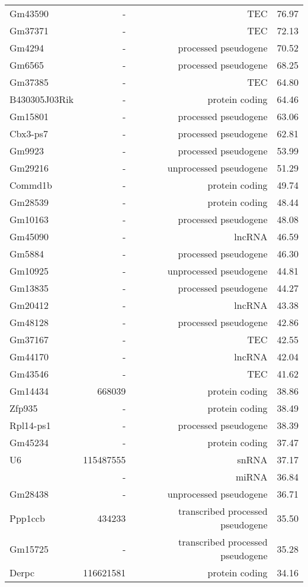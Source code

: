 \begin{longtable}[t]{lrrr}
Gm43590 & - & TEC & 76.97\\
Gm37371 & - & TEC & 72.13\\
Gm4294 & - & processed pseudogene & 70.52\\
\addlinespace
Gm6565 & - & processed pseudogene & 68.25\\
Gm37385 & - & TEC & 64.80\\
B430305J03Rik & - & protein coding & 64.46\\
Gm15801 & - & processed pseudogene & 63.06\\
Cbx3-ps7 & - & processed pseudogene & 62.81\\
\addlinespace
Gm9923 & - & processed pseudogene & 53.99\\
Gm29216 & - & unprocessed pseudogene & 51.29\\
Commd1b & - & protein coding & 49.74\\
Gm28539 & - & protein coding & 48.44\\
Gm10163 & - & processed pseudogene & 48.08\\
\addlinespace
Gm45090 & - & lncRNA & 46.59\\
Gm5884 & - & processed pseudogene & 46.30\\
Gm10925 & - & unprocessed pseudogene & 44.81\\
Gm13835 & - & processed pseudogene & 44.27\\
Gm20412 & - & lncRNA & 43.38\\
\addlinespace
Gm48128 & - & processed pseudogene & 42.86\\
Gm37167 & - & TEC & 42.55\\
Gm44170 & - & lncRNA & 42.04\\
Gm43546 & - & TEC & 41.62\\
Gm14434 & 668039 & protein coding & 38.86\\
\addlinespace
Zfp935 & - & protein coding & 38.49\\
Rpl14-ps1 & - & processed pseudogene & 38.39\\
Gm45234 & - & protein coding & 37.47\\
U6 & 115487555 & snRNA & 37.17\\
 & - & miRNA & 36.84\\
\addlinespace
Gm28438 & - & unprocessed pseudogene & 36.71\\
Ppp1ccb & 434233 & transcribed processed pseudogene & 35.50\\
Gm15725 & - & transcribed processed pseudogene & 35.28\\
Derpc & 116621581 & protein coding & 34.16\\

\end{longtable}
